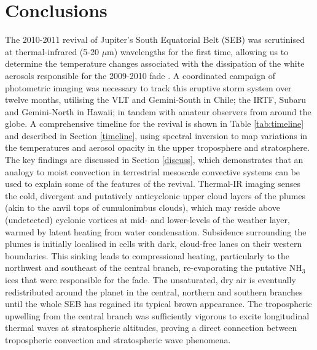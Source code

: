 \documentclass[final,authoryear,5p,times,twocolumn]{elsarticle}
\begin{document}
\section{Conclusions}
\label{conclusion}

The 2010-2011 revival of Jupiter's South Equatorial Belt (SEB) was scrutinised at thermal-infrared (5-20 $\mu$m) wavelengths for the first time, allowing us to determine the temperature changes associated with the dissipation of the white aerosols responsible for the 2009-2010 fade \citep{11fletcher_fade, 12perezhoyos}.  A coordinated campaign of photometric imaging was necessary to track this eruptive storm system over twelve months, utilising the VLT and Gemini-South in Chile; the IRTF, Subaru and Gemini-North in Hawaii; in tandem with amateur observers from around the globe.  A comprehensive timeline for the revival is shown in Table \ref{tab:timeline} and described in Section \ref{timeline}, using spectral inversion to map variations in the temperatures and aerosol opacity in the upper troposphere and stratosphere.  The key findings are discussed in Section \ref{discuss}, which demonstrates that an analogy to moist convection in terrestrial mesoscale convective systems \citep[squall lines and thunderstorm clusters,][]{00gierasch} can be used to explain some of the features of the revival.  Thermal-IR imaging senses the cold, divergent and putatively anticyclonic upper cloud layers of the plumes (akin to the anvil tops of cumulonimbus clouds), which may reside above (undetected) cyclonic vortices at mid- and lower-levels of the weather layer, warmed by latent heating from water condensation.   Subsidence surrounding the plumes is initially localised in cells with dark, cloud-free lanes on their western boundaries.  This sinking leads to compressional heating, particularly to the northwest and southeast of the central branch, re-evaporating the putative NH$_3$ ices that were responsible for the fade.  The unsaturated, dry air is eventually redistributed around the planet in the central, northern and southern branches until the whole SEB has regained its typical brown appearance.  The tropospheric upwelling from the central branch was sufficiently vigorous to excite longitudinal thermal waves at stratospheric altitudes, proving a direct connection between tropospheric convection and stratospheric wave phenomena. 
\end{document}
